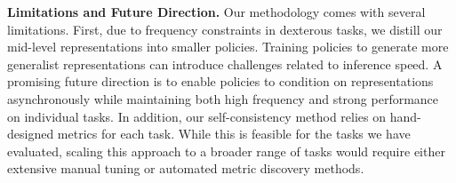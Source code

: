 \documentclass[conference,dvipsnames]{IEEEtran}
\begin{document}
\smallskip \noindent \textbf{Limitations and Future Direction.} 
Our methodology comes with several limitations. First, due to frequency constraints in dexterous tasks, we distill our mid-level representations into smaller policies. Training policies to generate more generalist representations can introduce challenges related to inference speed. A promising future direction is to enable policies to condition on representations asynchronously while maintaining both high frequency and strong performance on individual tasks. In addition, our self-consistency method relies on hand-designed metrics for each task. While this is feasible for the tasks we have evaluated, scaling this approach to a broader range of tasks would require either extensive manual tuning or automated metric discovery methods. 

\newpage






\clearpage
\newpage 

\appendix
\end{document}
